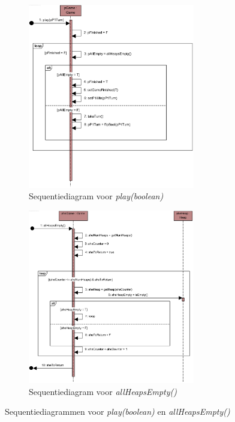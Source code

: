 	\begin{landscape}
		\newpage
		\thispagestyle{empty}
		\begin{figure}
			\begin{subfigure}{\textwidth}
				\includegraphics[width=0.8\textwidth]{chap-evaluatie/play.png}
				\caption{Sequentiediagram voor \textit{play(boolean)}}
				\label{fig:nim-play}
			\end{subfigure}%
			\begin{subfigure}{\textwidth}
				\includegraphics[width=0.8\textwidth]{chap-evaluatie/allHeapsEmpty.png}
				\caption{Sequentiediagram voor \textit{allHeapsEmpty()}}
				\label{fig:nim-allHeapsEmpty}
			\end{subfigure}
			\caption{Sequentiediagrammen voor \textit{play(boolean)} en \textit{allHeapsEmpty()}}
			\label{fig:nim-play-ahe}
		\end{figure}
	\end{landscape}
